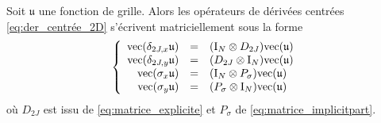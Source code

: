 \begin{proposition}
Soit $\mathfrak{u}$ une fonction de grille. Alors les opérateurs de dérivées centrées \eqref{eq:der_centrée_2D} s'écrivent matriciellement sous la forme
\begin{equation}
\left\lbrace
\begin{array}{rcl}
\text{vec}(\delta_{2J,x} \mathfrak{u}) & = & (\text{I}_N \otimes D_{2J}) \text{vec}(\mathfrak{u})\\
\text{vec}(\delta_{2J,y} \mathfrak{u}) & = & (D_{2J} \otimes \text{I}_N) \text{vec}(\mathfrak{u})\\
\text{vec}(\sigma_x \mathfrak{u}) & = & (\text{I}_N \otimes P_{\sigma}) \text{vec}(\mathfrak{u})\\
\text{vec}(\sigma_y \mathfrak{u}) & = & (P_{\sigma} \otimes \text{I}_N) \text{vec}(\mathfrak{u})\\
\end{array}\right.
\end{equation}
où $D_{2J}$ est issu de \eqref{eq:matrice_explicite} et $P_{\sigma}$ de \eqref{eq:matrice_implicitpart}.
\label{prop:op_der_simpson_mat}
\end{proposition}

